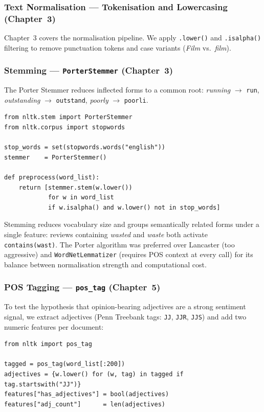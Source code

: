 \documentclass[11pt,a4paper]{article}
\begin{document}
\subsubsection{Text Normalisation --- Tokenisation and Lowercasing (Chapter~3)}

Chapter~3 covers the normalisation pipeline. We apply \texttt{.lower()} and
\texttt{.isalpha()} filtering to remove punctuation tokens and case variants
(\emph{Film} vs.\ \emph{film}).

\subsubsection{Stemming --- \texttt{PorterStemmer} (Chapter~3)}

The Porter Stemmer reduces inflected forms to a common root:
\emph{running} $\to$ \texttt{run}, \emph{outstanding} $\to$ \texttt{outstand},
\emph{poorly} $\to$ \texttt{poorli}.

\begin{lstlisting}[caption={Preprocessing pipeline using \texttt{PorterStemmer}.}]
from nltk.stem import PorterStemmer
from nltk.corpus import stopwords

stop_words = set(stopwords.words("english"))
stemmer    = PorterStemmer()

def preprocess(word_list):
    return [stemmer.stem(w.lower())
            for w in word_list
            if w.isalpha() and w.lower() not in stop_words]
\end{lstlisting}

Stemming reduces vocabulary size and groups semantically related forms under a single
feature: reviews containing \emph{wasted} and \emph{waste} both activate
\texttt{contains(wast)}. The Porter algorithm was preferred over Lancaster (too
aggressive) and \texttt{WordNetLemmatizer} (requires POS context at every call) for its
balance between normalisation strength and computational cost.

\subsubsection{POS Tagging --- \texttt{pos\_tag} (Chapter~5)}

To test the hypothesis that opinion-bearing adjectives are a strong sentiment signal, we
extract adjectives (Penn Treebank tags: \texttt{JJ}, \texttt{JJR}, \texttt{JJS}) and
add two numeric features per document:

\begin{lstlisting}[caption={POS-augmented feature extraction.}]
from nltk import pos_tag

tagged = pos_tag(word_list[:200])
adjectives = {w.lower() for (w, tag) in tagged if tag.startswith("JJ")}
features["has_adjectives"] = bool(adjectives)
features["adj_count"]      = len(adjectives)
\end{lstlisting}
\end{document}
